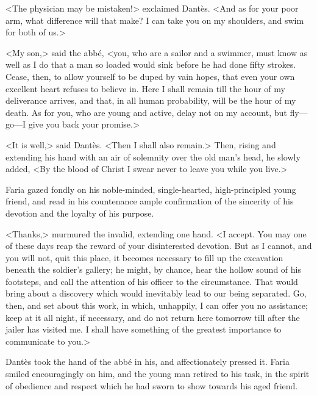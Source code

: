 <The physician may be mistaken!> exclaimed Dantès. <And as for your poor arm, what difference will that make? I can take you on my shoulders, and swim for both of us.> 

 <My son,> said the abbé, <you, who are a sailor and a swimmer, must know as well as I do that a man so loaded would sink before he had done fifty strokes. Cease, then, to allow yourself to be duped by vain hopes, that even your own excellent heart refuses to believe in. Here I shall remain till the hour of my deliverance arrives, and that, in all human probability, will be the hour of my death. As for you, who are young and active, delay not on my account, but fly—go—I give you back your promise.> 

 <It is well,> said Dantès. <Then I shall also remain.> Then, rising and extending his hand with an air of solemnity over the old man's head, he slowly added, <By the blood of Christ I swear never to leave you while you live.> 

 Faria gazed fondly on his noble-minded, single-hearted, high-principled young friend, and read in his countenance ample confirmation of the sincerity of his devotion and the loyalty of his purpose. 

 <Thanks,> murmured the invalid, extending one hand. <I accept. You may one of these days reap the reward of your disinterested devotion. But as I cannot, and you will not, quit this place, it becomes necessary to fill up the excavation beneath the soldier's gallery; he might, by chance, hear the hollow sound of his footsteps, and call the attention of his officer to the circumstance. That would bring about a discovery which would inevitably lead to our being separated. Go, then, and set about this work, in which, unhappily, I can offer you no assistance; keep at it all night, if necessary, and do not return here tomorrow till after the jailer has visited me. I shall have something of the greatest importance to communicate to you.> 

 Dantès took the hand of the abbé in his, and affectionately pressed it. Faria smiled encouragingly on him, and the young man retired to his task, in the spirit of obedience and respect which he had sworn to show towards his aged friend. 